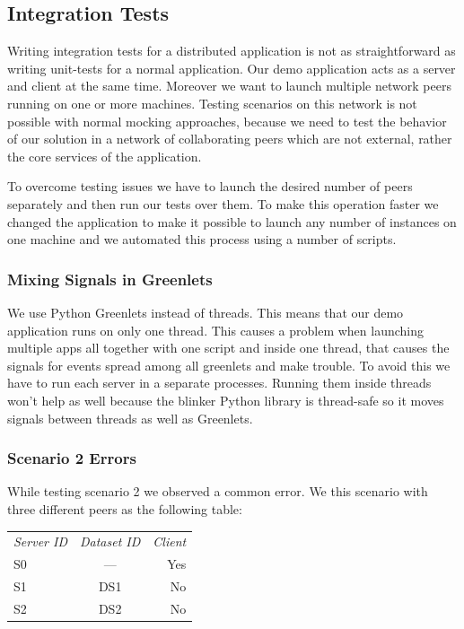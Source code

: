 \subsection{Integration Tests}
Writing integration tests for a distributed application is not as straightforward as writing unit-tests for a normal application. 
Our demo application acts as a server and client at the same time. Moreover we want to launch multiple 
network peers running on one or more machines. Testing scenarios on this network is not possible with
normal mocking approaches, because we need to test the behavior of our solution in a network of collaborating
peers which are not external, rather the core services of the application.

To overcome testing issues we have to launch the desired number of peers separately and then run our tests 
over them. To make this operation faster we changed the application to make it possible to launch any number
of instances on one machine and we automated this process using a number of scripts. %

\subsubsection{Mixing Signals in Greenlets}
We use Python Greenlets instead of threads. This means that our demo application runs on only one thread. 
This causes a problem when launching multiple apps all together with one script and inside one thread, that
causes the signals for events spread among all greenlets and make trouble. To avoid this we have to run
each server in a separate processes. Running them inside threads won't help as well because the blinker Python
library is thread-safe so it moves signals between threads as well as Greenlets.

\iffalse
\subsubsection{Scenario 2 Errors}
While testing scenario 2 we observed a common error. We this scenario with three different peers as the following table:

\begin{tabular}{ l c r }
\em{Server ID} & \em{ Dataset ID} & \em{ Client} \\
S0 & --- & Yes \\
S1 & DS1 & No \\
S2 & DS2 & No \\
\end{tabular}\\

